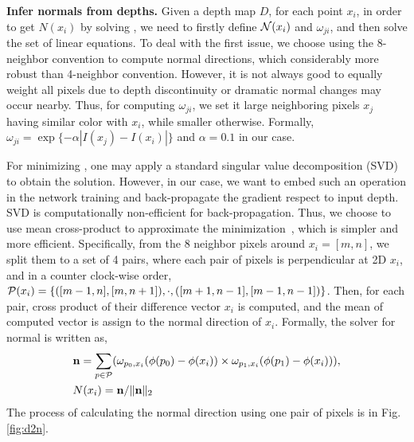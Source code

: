 \textbf{Infer normals from depths.} 
\label{chap:d2n}
Given a depth map $D$, for each point $x_i$, in order to get $N(x_i)$ by solving , we need to firstly define ${\mathcal N}(x_i)$ and $\omega_{ji}$, and then solve the set of linear equations. To deal with the first issue, we choose using the 8-neighbor convention to compute normal directions, which considerably more robust than 4-neighbor convention. 
However, it is not always good to equally weight all pixels due to depth discontinuity or dramatic normal changes may occur nearby. Thus, for computing $\omega_{ji}$, we set it large neighboring pixels $x_j$ having similar color with $x_i$, while smaller otherwise. Formally, $\omega_{ji} = \exp\{-\alpha|I(x_j) - I(x_i)|\}$ and $\alpha = 0.1$ in our case. 

For minimizing , one may apply a standard singular value decomposition (SVD) to obtain the solution. However, in our case, we want to embed such an operation in the network training and back-propagate the gradient respect to input depth. SVD is computationally non-efficient for back-propagation. Thus, we choose to use mean cross-product to approximate the minimization~\cite{jia2006using}, which is simpler and more efficient. 
Specifically, from the 8 neighbor pixels around $x_i = [m, n]$, we split them to a set of 4 pairs, where each pair of pixels is perpendicular at 2D \wrt $x_i$, and in a counter clock-wise order, \ie ${\mathcal P}(x_i) = \{([m-1, n], [m, n+1]), \cdot, ([m+1, n-1], [m-1, n-1])\}$. 
Then, for each pair, cross product of their difference vector \wrt $x_i$ is computed, and the mean of computed vector is assign to the normal direction of $x_i$. Formally, the solver for normal is written as, 
\begin{align}
\label{eq:cross}
&{\mathbf n} = \sum_{p\in{\mathcal P}}(\omega_{p_{0}, x_i}(\phi(p_{0}) - \phi(x_i)) \times \omega_{p_{1}, x_i}(\phi(p_{1}) - \phi(x_i))), \nonumber \\
&N(x_i) = {\mathbf n} / \|{\mathbf n}\|_2
\end{align}
The process of calculating the normal direction using one pair of pixels is in Fig. \ref{fig:d2n}. 


